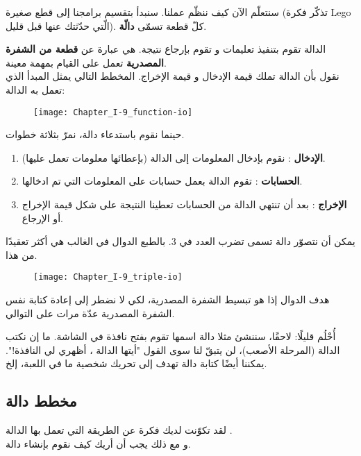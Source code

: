 سنتعلّم الآن كيف ننظّم عملنا. سنبدأ بتقسيم برامجنا إلى قطع صغيرة (تذكّر فكرة
\textenglish{Lego}
الّتي حدّثتك عنها قبل قليل). كلّ قطعة تسمّى
\textbf{دالّة}.

الدالة تقوم بتنفيذ تعليمات و تقوم بإرجاع نتيجة. هي عبارة عن 
\textbf{قطعة من الشفرة المصدرية} 
تعمل على القيام بمهمة معينة.\\
نقول بأن الدالة تملك قيمة الإدخال و قيمة الإخراج. المخطط التالي يمثل المبدأ الذي تعمل به الدالة:

\begin{figure}[H]
	\centering
	\texttt{[image: Chapter\_I-9\_function-io]}
\end{figure}

حينما نقوم باستدعاء دالة، نمرّ بثلاثة خطوات.

\begin{enumerate}
	\item \textbf{الإدخال}
: نقوم بإدخال المعلومات إلى الدالة (بإعطائها معلومات تعمل عليها).
	\item \textbf{الحسابات}
: تقوم الدالة بعمل حسابات على المعلومات التي تم ادخالها.
	\item \textbf{الإخراج}
: بعد أن تنتهي الدالة من الحسابات تعطينا النتيجة على شكل قيمة الإخراج أو الإرجاع.
\end{enumerate}

يمكن أن نتصوّر دالة تسمى
تضرب العدد في 3. بالطبع الدوال في الغالب هي أكثر تعقيدًا من هذا.

\begin{figure}[H]
	\centering
	\texttt{[image: Chapter\_I-9\_triple-io]}
\end{figure}

هدف الدوال إذا هو تبسيط الشفرة المصدرية، لكي لا نضطر إلى إعادة كتابة نفس الشفرة المصدرية عدّة مرات على التوالي.

أُحْلُم قليلًا: لاحقًا، سننشئ مثلا دالة اسمها
تقوم بفتح نافذة في الشاشة. ما إن نكتب الدالة (المرحلة الأصعب)، لن يتبقّ لنا سوى القول "أيتها الدالة
،
أظهري لي النافذة!". يمكننا أيضًا كتابة دالة
تهدف إلى تحريك شخصية ما في اللعبة، إلخ.

\subsection{مخطط دالة}

لقد تكوّنت لديك فكرة عن الطريقة التي تعمل بها الدالة 
.\\
و مع ذلك يجب أن أريك كيف نقوم بإنشاء دالة. 

